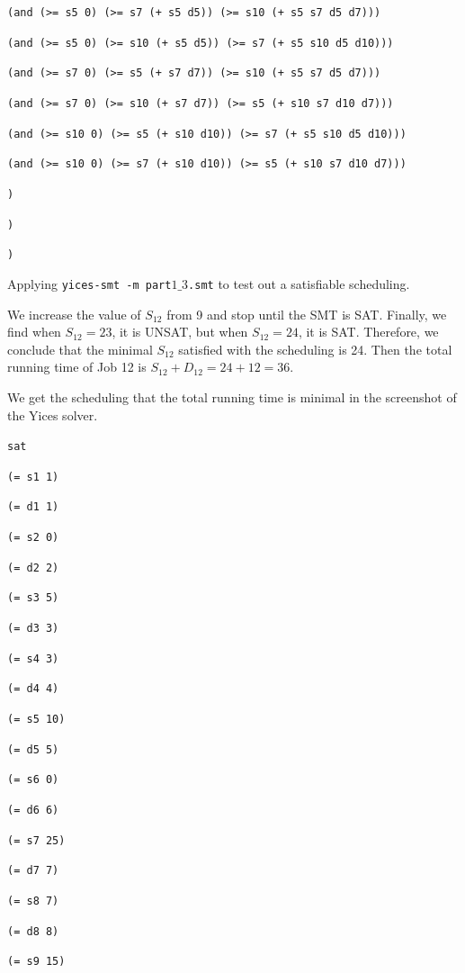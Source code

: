 \documentclass[11pt]{article}
\begin{document}
{{{{\tt (and (>= s5 0) (>= s7 (+ s5 d5)) (>= s10 (+ s5 s7 d5 d7)))}

{\tt (and (>= s5 0) (>= s10 (+ s5 d5)) (>= s7 (+ s5 s10 d5 d10)))}

{\tt (and (>= s7 0) (>= s5 (+ s7 d7)) (>= s10 (+ s5 s7 d5 d7)))}

{\tt (and (>= s7 0) (>= s10 (+ s7 d7)) (>= s5 (+ s10 s7 d10 d7)))}

{\tt (and (>= s10 0) (>= s5 (+ s10 d10)) (>= s7 (+ s5 s10 d5 d10)))}

{\tt (and (>= s10 0) (>= s7 (+ s10 d10)) (>= s5 (+ s10 s7 d10 d7)))}

{\tt )}

{\tt )}

{\tt )}

}

\vspace{3mm}

Applying {\tt yices-smt -m part$1\_3$.smt} to test out a satisfiable scheduling.

We increase the value of $S_{12}$ from 9 and stop until the SMT is SAT. Finally, we find when $S_{12} = 23$, it is UNSAT, but when $S_{12} = 24$, it is SAT. Therefore, we conclude that the minimal $S_{12}$ satisfied with the scheduling is 24. Then the total running time of Job 12 is $S_{12} + D_12 = 24 + 12 = 36$.

We get the scheduling that the total running time is minimal in the screenshot of the Yices solver.

{\footnotesize

{\tt sat}

{\tt (= s1 1)}

{\tt (= d1 1)}

{\tt (= s2 0)}

{\tt (= d2 2)}

{\tt (= s3 5)}

{\tt (= d3 3)}

{\tt (= s4 3)}

{\tt (= d4 4)}

{\tt (= s5 10)}

{\tt (= d5 5)}

{\tt (= s6 0)}

{\tt (= d6 6)}

{\tt (= s7 25)}

{\tt (= d7 7)}

{\tt (= s8 7)}

{\tt (= d8 8)}

{\tt (= s9 15)}

}}}
\end{document}
